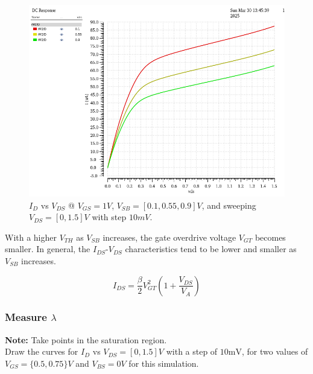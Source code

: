 
\begin{figure}[H]
	\centering
	\includegraphics[width=.6\linewidth]{sections/pic/EX3_NMOS_Id&Vds(Vgs=0_1)(w)(l).png}
	\caption{$I_{D}$ vs $V_{DS}$ @ $V_{GS} = 1V$, $V_{SB} = [0.1, 0.55, 0.9] V$, and sweeping $V_{DS} = [0, 1.5] V$ with step $10mV$.}
	\label{f_EX3_NMOS_Id&Vds(Vgs=0_1)(w)(l)}
\end{figure}

\begin{discussion}
	\item With a higher \( V_{TH} \) as \( V_{SB} \) increases, the gate overdrive voltage \( V_{GT} \) becomes smaller. In general, the \( I_{DS} \)-\( V_{DS} \) characteristics tend to be lower and smaller as \( V_{SB} \) increases. 
	
	\[ I_{DS} = \dfrac{\beta}{2} V_{GT}^{2} \left( 1 + \dfrac{V_{DS}}{V_{A}} \right)\]
\end{discussion}

\subsubsection{Measure $\lambda$}
\textbf{Note:} Take points in the saturation region.\\

Draw the curves for $I_{D}$ vs $V_{DS} = [0, 1.5] V$ with a step of $10\text{mV}$, for two values of $V_{GS} = \{0.5, 0.75\} V$ and $V_{BS} = 0V$ for this simulation.\\


